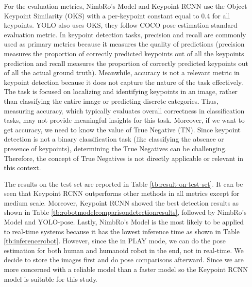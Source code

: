 For the evaluation metrics, NimbRo's Model and Keypoint RCNN use the Object Keypoint Similarity (OKS) with a per-keypoint constant equal to 0.4 for all keypoints.
YOLO also uses OKS, they follow COCO pose estimation standard evaluation metric.
In keypoint detection tasks, precision and recall are commonly used as primary metrics because it measures the quality of predictions (precision measures the proportion of correctly predicted keypoints out of all the keypoints prediction and
  recall measures the proportion of correctly predicted keypoints out of all the actual ground truth). Meanwhile, accuracy is not a relevant metric in keypoint detection because it does not capture the nature of the task effectively.
The task is focused on localizing and identifying keypoints in an image, rather than classifying the entire image or predicting discrete categories. Thus, measuring accuracy, which typically evaluates overall correctness in classification tasks,
  may not provide meaningful insights for this task. Moreover, if we want to get accuracy, we need to know the value of True Negative (TN). Since keypoint detection is not a binary classification task (like classifying the absence or presence of keypoints),
  determining the True Negatives can be challenging. Therefore, the concept of True Negatives is not directly applicable or relevant in this context.

The results on the test set are reported in Table \ref{tb:result-on-test-set}. It can be seen that Keypoint RCNN outperforms other methods in all metrics except for medium scale.
Moreover, Keypoint RCNN showed the best detection results as shown in Table \ref{tb:robotmodelcomparisondetectionresults}, followed by NimbRo's Model and YOLO-pose.
Lastly, NimbRo's Model is the most likely to be applied to real-time systems because it has the lowest inference time as shown in Table \ref{tb:inferencerobot}.
However, since the in PLAY mode, we can do the pose estimation for both human and humanoid robot in the end, not in real-time.
We decide to store the images first and do pose comparisons afterward. Since we are more concerned with a reliable model than a faster model so the Keypoint RCNN model is suitable for this study.

